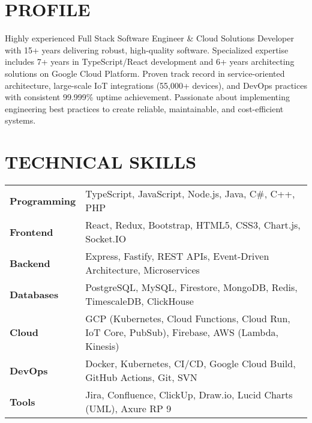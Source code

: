 \documentclass{fullstackdeveloper-ats}
\begin{document}

\vspace{0.3cm}

\section{PROFILE}
\justify
Highly experienced Full Stack Software Engineer \& Cloud Solutions Developer with 15+ years delivering robust, high-quality software. Specialized expertise includes 7+ years in TypeScript/React development and 6+ years architecting solutions on Google Cloud Platform. Proven track record in service-oriented architecture, large-scale IoT integrations (55,000+ devices), and DevOps practices with consistent 99.999\% uptime achievement. Passionate about implementing engineering best practices to create reliable, maintainable, and cost-efficient systems.

\section{TECHNICAL SKILLS}

\begin{tabular}{p{2.5cm}p{14cm}}
\textbf{Programming} & TypeScript, JavaScript, Node.js, Java, C\#, C++, PHP \\[0.2cm]
\textbf{Frontend} & React, Redux, Bootstrap, HTML5, CSS3, Chart.js, Socket.IO \\[0.2cm]
\textbf{Backend} & Express, Fastify, REST APIs, Event-Driven Architecture, Microservices \\[0.2cm]
\textbf{Databases} & PostgreSQL, MySQL, Firestore, MongoDB, Redis, TimescaleDB, ClickHouse \\[0.2cm]
\textbf{Cloud} & GCP (Kubernetes, Cloud Functions, Cloud Run, IoT Core, PubSub), Firebase, AWS (Lambda, Kinesis) \\[0.2cm]
\textbf{DevOps} & Docker, Kubernetes, CI/CD, Google Cloud Build, GitHub Actions, Git, SVN \\[0.2cm]
\textbf{Tools} & Jira, Confluence, ClickUp, Draw.io, Lucid Charts (UML), Axure RP 9 \\
\end{tabular}
\end{document}
